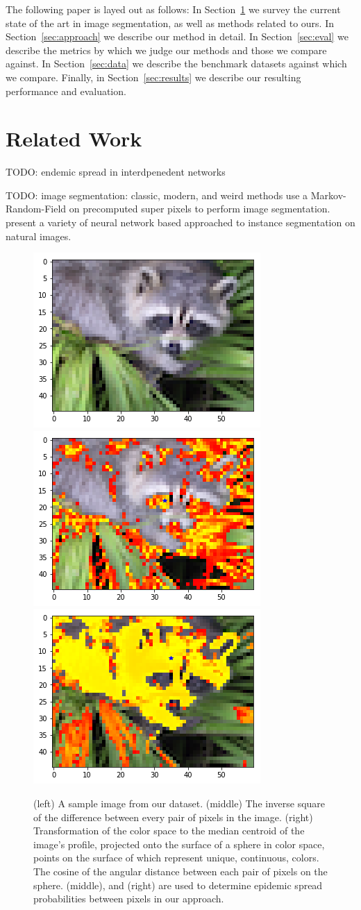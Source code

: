 \documentclass[twocolumn]{article}
\newcommand{\todo}[1]{}
\renewcommand{\todo}[1]{{\color{red} TODO: {#1}}}
\newcommand{\secref}[1]{Section~\ref{sec:#1}}
\newcommand{\seclab}[1]{\label{sec:#1}}
\newcommand{\figlab}[1]{\label{fig:#1}}
\begin{document}
The following paper is layed out as follows: In \secref{related} we survey the
current state of the art in image segmentation, as well as methods related to
ours. In \secref{approach} we describe our method in detail. In \secref{eval} we
describe the metrics by which we judge our methods and those we compare against.
In \secref{data} we describe the benchmark datasets against which we compare.
Finally, in \secref{results} we describe our resulting performance and
evaluation.

\section{Related Work}\seclab{related}

\todo{endemic spread in interdpenedent networks}

\todo{image segmentation: classic, modern, and weird methods}
\cite{pei2014saliency} use a Markov-Random-Field on precomputed super pixels to
perform image segmentation.  \cite{newell2017associative,li2017fully,ren2017end}
present a variety of neural network based approached to instance segmentation on
natural images.

\begin{figure}[t]
\centering

\includegraphics[width=0.3\linewidth]{figs/input.png}
\includegraphics[width=0.3\linewidth]{figs/alpha.png}
\includegraphics[width=0.3\linewidth]{figs/beta.png}

\caption{
(left) A sample image from our dataset.
(middle) The inverse square of the difference between every pair of pixels in
the image. 
(right) Transformation of the color space to the median centroid of the image's
profile, projected onto the surface of a sphere in color space, points on the
surface of which represent unique, continuous, colors. The cosine of the angular
distance between each pair of pixels on the sphere.
(middle), and (right) are used to determine epidemic spread probabilities
between pixels in our approach.
}
\figlab{alpha_beta}
\end{figure}
\end{document}
